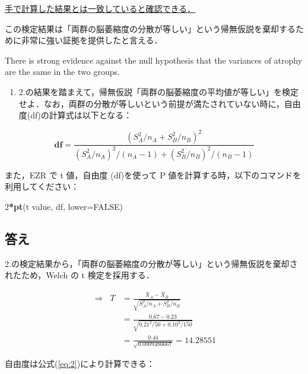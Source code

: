 \documentclass[11pt,]{problemset}
\newenvironment{Shaded}{\begin{snugshade}}{\end{snugshade}}
\newcommand{\DataTypeTok}[1]{\textcolor[rgb]{0.13,0.29,0.53}{#1}}
\newcommand{\DecValTok}[1]{\textcolor[rgb]{0.00,0.00,0.81}{#1}}
\newcommand{\KeywordTok}[1]{\textcolor[rgb]{0.13,0.29,0.53}{\textbf{#1}}}
\newcommand{\NormalTok}[1]{#1}
\newcommand{\OperatorTok}[1]{\textcolor[rgb]{0.81,0.36,0.00}{\textbf{#1}}}
\newcommand{\OtherTok}[1]{\textcolor[rgb]{0.56,0.35,0.01}{#1}}
\providecommand{\tightlist}{%
  \setlength{\itemsep}{0pt}\setlength{\parskip}{0pt}}
\begin{document}
\underline{手で計算した結果とは一致していると確認できる．}

この検定結果は「両群の脳萎縮度の分散が等しい」という帰無仮説を棄却するために非常に強い証拠を提供したと言える．

There is strong evidence against the null hypothesis that the variances
of atrophy are the same in the two groups.

\newpage
\vfill

\begin{enumerate}
\def\labelenumi{\arabic{enumi}.}
\setcounter{enumi}{2}
\tightlist
\item
  2.の結果を踏まえて，帰無仮説「両群の脳萎縮度の平均値が等しい」を検定せよ．なお，両群の分散が等しいという前提が満たされていない時に，自由度(df)の計算式は以下となる：
\end{enumerate}

\begin{equation}
\label{eq:2}
\mathbf{df} = \frac{(S^2_A/n_A + S^2_B/n_B)^2}{(S_A^2/n_A)^2/(n_A-1)+(S_B^2/n_B)^2/(n_B-1)}
\end{equation}

また，EZR で t 値，自由度 (df)を使って P
値を計算する時，以下のコマンドを利用してください：

\begin{Shaded}
\begin{Highlighting}[]
\DecValTok{2}\OperatorTok{*}\KeywordTok{pt}\NormalTok{(t value, df, }\DataTypeTok{lower=}\OtherTok{FALSE}\NormalTok{)}
\end{Highlighting}
\end{Shaded}

\hypertarget{-2}{%
\subsection{答え}\label{-2}}

2.の検定結果から，「両群の脳萎縮度の分散が等しい」という帰無仮説を棄却されたため，Welch
の t 検定を採用する．

\[
\begin{aligned}
\Rightarrow\;\; T & = \frac{\bar{X}_A - \bar{X}_B}{\sqrt{S^2_A/n_A + S^2_B/n_B}} \\ 
                  & = \frac{0.67 - 0.23}{\sqrt{0.21^2/50 + 0.10^2/150}} \\ 
                  & = \frac{0.44}{\sqrt{0.0009486667}} = 14.28551
\end{aligned}
\]

自由度は公式(\ref{eq:2})により計算できる：
\end{document}
